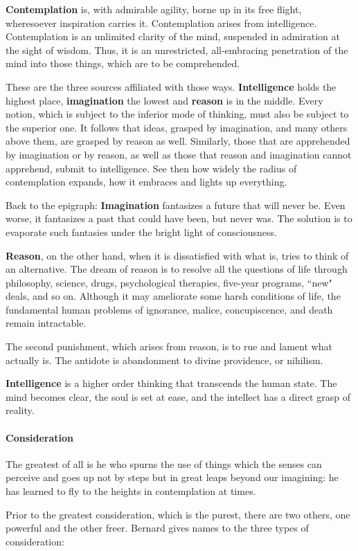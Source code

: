 \textbf{Contemplation} is, with admirable agility, borne up in its free flight, wheresoever inspiration carries it. Contemplation arises from intelligence. Contemplation is an unlimited clarity of the mind, suspended in admiration at the sight of wisdom. Thus, it is an unrestricted, all-embracing penetration of the mind into those things, which are to be comprehended.

\begin{quotex}
These are the three sources affiliated with those ways. \textbf{Intelligence} holds the highest place, \textbf{imagination} the lowest and \textbf{reason} is in the middle. Every notion, which is subject to the inferior mode of thinking, must also be subject to the superior one. It follows that ideas, grasped by imagination, and many others above them, are grasped by reason as well. Similarly, those that are apprehended by imagination or by reason, as well as those that reason and imagination cannot apprehend, submit to intelligence. See then how widely the radius of contemplation expands, how it embraces and lights up everything. 

\end{quotex}
Back to the epigraph: \textbf{Imagination} fantasizes a future that will never be. Even worse, it fantasizes a past that could have been, but never was. The solution is to evaporate such fantasies under the bright light of consciousness.

\textbf{Reason}, on the other hand, when it is dissatisfied with what is, tries to think of an alternative. The dream of reason is to resolve all the questions of life through philosophy, science, drugs, psychological therapies, five-year programs, ``new" deals, and so on. Although it may ameliorate some harsh conditions of life, the fundamental human problems of ignorance, malice, concupiscence, and death remain intractable.

The second punishment, which arises from reason, is to rue and lament what actually is. The antidote is abandonment to divine providence, or nihilism.

\textbf{Intelligence} is a higher order thinking that transcends the human state. The mind becomes clear, the soul is set at ease, and the intellect has a direct grasp of reality.

\paragraph{Consideration}
\begin{quotex}
The greatest of all is he who spurns the use of things which the senses can perceive and goes up not by steps but in great leaps beyond our imagining: he has learned to fly to the heights in contemplation at times. 

\end{quotex}
Prior to the greatest consideration, which is the purest, there are two others, one powerful and the other freer. Bernard gives names to the three types of consideration:

